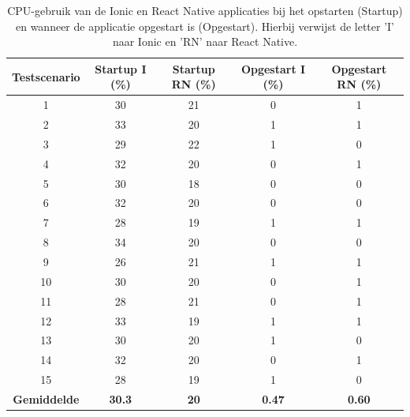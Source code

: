 \begin{table}[htbp]
  \centering
  \footnotesize
  \begin{tabular}{|c|c|c|c|c|}
      \hline
      \textbf{Testscenario} & \textbf{Startup I (\%)} & \textbf{Startup RN (\%)} & \textbf{Opgestart I (\%)} & \textbf{Opgestart RN (\%)} \\
      \hline
      1 & 30 & 21 & 0 & 1 \\
      \hline
      2 & 33 & 20 & 1 & 1 \\
      \hline
      3 & 29 & 22 & 1 & 0 \\
      \hline
      4 & 32 & 20 & 0 & 1 \\
      \hline
      5 & 30 & 18 & 0 & 0 \\
      \hline
      6 & 32 & 20 & 0 & 0 \\
      \hline
      7 & 28 & 19 & 1 & 1 \\
      \hline
      8 & 34 & 20 & 0 & 0 \\
      \hline
      9 & 26 & 21 & 1 & 1 \\
      \hline
      10 & 30 & 20 & 0 & 1 \\
      \hline
      11 & 28 & 21 & 0 & 1 \\
      \hline
      12 & 33 & 19 & 1 & 1 \\
      \hline
      13 & 30 & 20 & 1 & 0 \\
      \hline
      14 & 32 & 20 & 0 & 1 \\
      \hline
      15 & 28 & 19 & 1 & 0 \\
      \hline
      \textbf{Gemiddelde} & \textbf{30.3} & \textbf{20} & \textbf{0.47} & \textbf{0.60} \\
      \hline
  \end{tabular}
  \caption{CPU-gebruik van de Ionic en React Native applicaties bij het opstarten (Startup) en wanneer de applicatie opgestart is (Opgestart). Hierbij verwijst de letter 'I' naar Ionic en 'RN' naar React Native.}
  \label{tab:cpu1}
\end{table}

